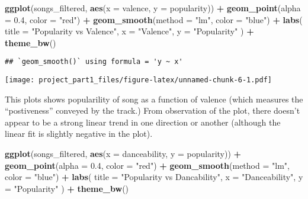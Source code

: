 \documentclass[
]{article}
\newenvironment{Shaded}{\begin{snugshade}}{\end{snugshade}}
\newcommand{\AttributeTok}[1]{\textcolor[rgb]{0.13,0.29,0.53}{#1}}
\newcommand{\FloatTok}[1]{\textcolor[rgb]{0.00,0.00,0.81}{#1}}
\newcommand{\FunctionTok}[1]{\textcolor[rgb]{0.13,0.29,0.53}{\textbf{#1}}}
\newcommand{\NormalTok}[1]{#1}
\newcommand{\SpecialCharTok}[1]{\textcolor[rgb]{0.81,0.36,0.00}{\textbf{#1}}}
\newcommand{\StringTok}[1]{\textcolor[rgb]{0.31,0.60,0.02}{#1}}
\begin{document}
\begin{Shaded}
\begin{Highlighting}[]
\FunctionTok{ggplot}\NormalTok{(songs\_filtered, }\FunctionTok{aes}\NormalTok{(}\AttributeTok{x =}\NormalTok{ valence, }\AttributeTok{y =}\NormalTok{ popularity)) }\SpecialCharTok{+}
  \FunctionTok{geom\_point}\NormalTok{(}\AttributeTok{alpha =} \FloatTok{0.4}\NormalTok{, }\AttributeTok{color =} \StringTok{"red"}\NormalTok{) }\SpecialCharTok{+} 
  \FunctionTok{geom\_smooth}\NormalTok{(}\AttributeTok{method =} \StringTok{"lm"}\NormalTok{, }\AttributeTok{color =} \StringTok{"blue"}\NormalTok{) }\SpecialCharTok{+}
  \FunctionTok{labs}\NormalTok{(}
    \AttributeTok{title =} \StringTok{"Popularity vs Valence"}\NormalTok{,}
    \AttributeTok{x =} \StringTok{"Valence"}\NormalTok{,}
    \AttributeTok{y =} \StringTok{"Popularity"}
\NormalTok{  ) }\SpecialCharTok{+}
  \FunctionTok{theme\_bw}\NormalTok{()}
\end{Highlighting}
\end{Shaded}

\begin{verbatim}
## `geom_smooth()` using formula = 'y ~ x'
\end{verbatim}

\texttt{[image: project\_part1\_files/figure-latex/unnamed-chunk-6-1.pdf]}

This plots shows popularility of song as a function of valence (which
measures the ``postiveness'' conveyed by the track.) From observation of
the plot, there doesn't appear to be a strong linear trend in one
direction or another (although the linear fit is slightly negative in
the plot).

\begin{Shaded}
\begin{Highlighting}[]
\FunctionTok{ggplot}\NormalTok{(songs\_filtered, }\FunctionTok{aes}\NormalTok{(}\AttributeTok{x =}\NormalTok{ danceability, }\AttributeTok{y =}\NormalTok{ popularity)) }\SpecialCharTok{+}
  \FunctionTok{geom\_point}\NormalTok{(}\AttributeTok{alpha =} \FloatTok{0.4}\NormalTok{, }\AttributeTok{color =} \StringTok{"red"}\NormalTok{) }\SpecialCharTok{+} 
  \FunctionTok{geom\_smooth}\NormalTok{(}\AttributeTok{method =} \StringTok{"lm"}\NormalTok{, }\AttributeTok{color =} \StringTok{"blue"}\NormalTok{) }\SpecialCharTok{+}
  \FunctionTok{labs}\NormalTok{(}
    \AttributeTok{title =} \StringTok{"Popularity vs Dancability"}\NormalTok{,}
    \AttributeTok{x =} \StringTok{"Danceability"}\NormalTok{,}
    \AttributeTok{y =} \StringTok{"Popularity"}
\NormalTok{  ) }\SpecialCharTok{+}
  \FunctionTok{theme\_bw}\NormalTok{()}
\end{Highlighting}
\end{Shaded}
\end{document}
